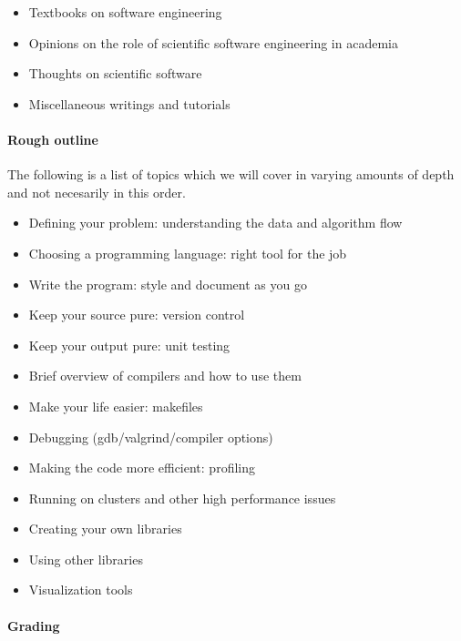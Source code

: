\documentclass[12 pt]{article}
\begin{document}
\begin{itemize}
\item Textbooks on software engineering \cite{Sommerville2011,Nanz2011}
\item Opinions on the role of scientific software engineering in academia \cite{Todorov2012,Dirk2012}
\item Thoughts on scientific software \cite{Katzgraber2010,Hannay2009,Smith2007}
\item Miscellaneous writings and tutorials \cite{make,Prentice1998,Gube2011,Spolsky2012}
\end{itemize}

\paragraph{Rough outline}

The following is a list of topics which we will cover in varying
amounts of depth and not necesarily in this order.
\begin{itemize}
\item Defining your problem: understanding the data and algorithm flow
\item Choosing a programming language: right tool for the job
\item Write the program: style and document as you go
\item Keep your source pure: version control
\item Keep your output pure: unit testing
\item Brief overview of compilers and how to use them
\item Make your life easier: makefiles
\item Debugging (gdb/valgrind/compiler options)
\item Making the code more efficient: profiling
\item Running on clusters and other high performance issues
\item Creating your own libraries
\item Using other libraries
\item Visualization tools
\end{itemize}

\paragraph{Grading}
\end{document}
